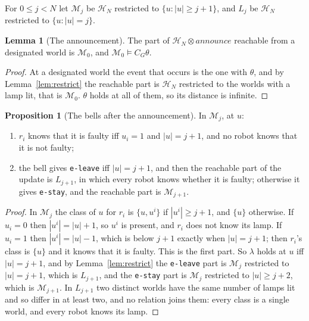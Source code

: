 \documentclass[11pt,a4paper]{article}
\theoremstyle{definition}
\newtheorem{proposition}{Proposition}
\newtheorem{lemma}{Lemma}
\newcommand{\Mod}{\mathcal{M}}
\newcommand{\prd}{\otimes}
\newcommand{\Cop}[1]{C_{#1}}
\newcommand{\code}[1]{\texttt{\small #1}}
\newcommand{\Hc}{\mathcal{H}}
\newcommand{\some}{\theta}
\begin{document}
For $0 \leq j < N$ let $\Mod_j$ be $\Hc_N$ restricted to
$\{u : |u| \geq j + 1\}$, and $L_j$ be $\Hc_N$ restricted to
$\{u : |u| = j\}$.

\begin{lemma}[The announcement]
\label{lem:announce}
The part of $\Hc_N \prd \mathit{announce}$ reachable from a designated world is
$\Mod_0$, and $\Mod_0 \models \Cop{G}\some$.
\end{lemma}

\begin{proof}
At a designated world the event that occurs is the one with $\some$, and by
Lemma~\ref{lem:restrict} the reachable part is $\Hc_N$ restricted to the worlds
with a lamp lit, that is $\Mod_0$. $\some$ holds at all of them, so its distance
is infinite.
\end{proof}

\begin{proposition}[The bells after the announcement]
\label{prop:bells}
In $\Mod_j$, at $u$:
\begin{enumerate}[leftmargin=1.6em, itemsep=1pt]
  \item $r_i$ knows that it is faulty iff $u_i = 1$ and $|u| = j+1$, and no robot
        knows that it is not faulty;
  \item the bell gives \code{e-leave} iff $|u| = j+1$, and then the reachable
        part of the update is $L_{j+1}$, in which every robot knows whether it
        is faulty; otherwise it gives \code{e-stay}, and the reachable part is
        $\Mod_{j+1}$.
\end{enumerate}
\end{proposition}

\begin{proof}
In $\Mod_j$ the class of $u$ for $r_i$ is $\{u, u^i\}$ if $|u^i| \geq j+1$, and
$\{u\}$ otherwise. If $u_i = 0$ then $|u^i| = |u| + 1$, so $u^i$ is present, and
$r_i$ does not know its lamp. If $u_i = 1$ then $|u^i| = |u| - 1$, which is
below $j+1$ exactly when $|u| = j+1$; then $r_i$'s class is $\{u\}$ and it knows
that it is faulty. This is the first part. So $\lambda$ holds at $u$ iff
$|u| = j+1$, and by Lemma~\ref{lem:restrict} the \code{e-leave} part is
$\Mod_j$ restricted to $|u| = j+1$, which is $L_{j+1}$, and the \code{e-stay}
part is $\Mod_j$ restricted to $|u| \geq j+2$, which is $\Mod_{j+1}$. In
$L_{j+1}$ two distinct worlds have the same number of lamps lit and so differ in
at least two, and no relation joins them: every class is a single world, and
every robot knows its lamp.
\end{proof}
\end{document}
